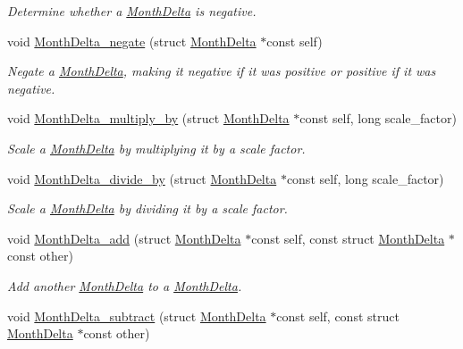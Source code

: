 \begin{DoxyCompactItemize}
\begin{DoxyCompactList}\small\item\em Determine whether a \hyperlink{structMonthDelta}{Month\-Delta} is negative. \end{DoxyCompactList}\item 
void \hyperlink{month-delta_8h_a4d77c910d4ec5841e5e3f59d63490078}{Month\-Delta\-\_\-negate} (struct \hyperlink{structMonthDelta}{Month\-Delta} $\ast$const self)
\begin{DoxyCompactList}\small\item\em Negate a \hyperlink{structMonthDelta}{Month\-Delta}, making it negative if it was positive or positive if it was negative. \end{DoxyCompactList}\item 
void \hyperlink{month-delta_8h_a61a8d675cbd204acd027d8d92a39a8ec}{Month\-Delta\-\_\-multiply\-\_\-by} (struct \hyperlink{structMonthDelta}{Month\-Delta} $\ast$const self, long scale\-\_\-factor)
\begin{DoxyCompactList}\small\item\em Scale a \hyperlink{structMonthDelta}{Month\-Delta} by multiplying it by a scale factor. \end{DoxyCompactList}\item 
void \hyperlink{month-delta_8h_adb023ff0cce64e3111ffa553dd517a45}{Month\-Delta\-\_\-divide\-\_\-by} (struct \hyperlink{structMonthDelta}{Month\-Delta} $\ast$const self, long scale\-\_\-factor)
\begin{DoxyCompactList}\small\item\em Scale a \hyperlink{structMonthDelta}{Month\-Delta} by dividing it by a scale factor. \end{DoxyCompactList}\item 
void \hyperlink{month-delta_8h_abfad34a14bf54d199a2f87eaef326cd7}{Month\-Delta\-\_\-add} (struct \hyperlink{structMonthDelta}{Month\-Delta} $\ast$const self, const struct \hyperlink{structMonthDelta}{Month\-Delta} $\ast$const other)
\begin{DoxyCompactList}\small\item\em Add another \hyperlink{structMonthDelta}{Month\-Delta} to a \hyperlink{structMonthDelta}{Month\-Delta}. \end{DoxyCompactList}\item 
void \hyperlink{month-delta_8h_a1f28431851a8b020b8a325cfbfbfdb44}{Month\-Delta\-\_\-subtract} (struct \hyperlink{structMonthDelta}{Month\-Delta} $\ast$const self, const struct \hyperlink{structMonthDelta}{Month\-Delta} $\ast$const other)

\end{DoxyCompactItemize}
